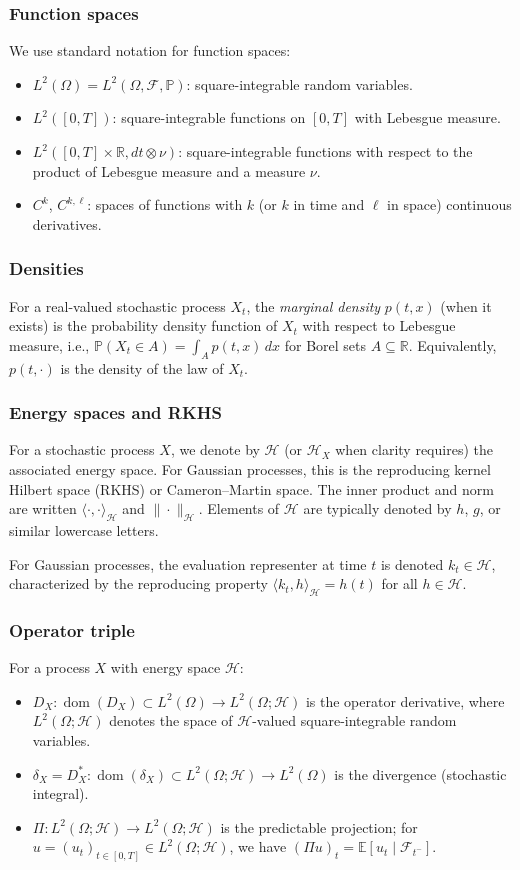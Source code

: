 \documentclass[12pt]{article}
\theoremstyle{plain}
\theoremstyle{definition}
\theoremstyle{remark}
\newcommand{\E}{\mathbb{E}}
\newcommand{\R}{\mathbb{R}}
\newcommand{\F}{\mathcal{F}}
\newcommand{\PP}{\mathbb{P}}
\newcommand{\HH}{\mathcal{H}}
\newcommand{\dom}{\operatorname{dom}}
\begin{document}
\subsubsection*{Function spaces}
We use standard notation for function spaces:
\begin{itemize}
\item $L^2(\Omega) = L^2(\Omega, \F, \PP)$: square-integrable random variables.
\item $L^2([0,T])$: square-integrable functions on $[0,T]$ with Lebesgue measure.
\item $L^2([0,T] \times \R, dt \otimes \nu)$: square-integrable functions with respect to the product of Lebesgue measure and a measure $\nu$.
\item $C^{k}$, $C^{k,\ell}$: spaces of functions with $k$ (or $k$ in time and $\ell$ in space) continuous derivatives.
\end{itemize}

\subsubsection*{Densities}
For a real-valued stochastic process $X_t$, the \emph{marginal density} $p(t,x)$ (when it exists) is the probability density function of $X_t$ with respect to Lebesgue measure, i.e., $\PP(X_t \in A) = \int_A p(t,x)\,dx$ for Borel sets $A \subseteq \R$. Equivalently, $p(t,\cdot)$ is the density of the law of $X_t$.

\subsubsection*{Energy spaces and RKHS}
For a stochastic process $X$, we denote by $\HH$ (or $\HH_X$ when clarity requires) the associated energy space. For Gaussian processes, this is the reproducing kernel Hilbert space (RKHS) or Cameron--Martin space. The inner product and norm are written $\langle \cdot, \cdot \rangle_{\HH}$ and $\|\cdot\|_{\HH}$. Elements of $\HH$ are typically denoted by $h$, $g$, or similar lowercase letters.

For Gaussian processes, the evaluation representer at time $t$ is denoted $k_t \in \HH$, characterized by the reproducing property $\langle k_t, h \rangle_{\HH} = h(t)$ for all $h \in \HH$.

\subsubsection*{Operator triple}
For a process $X$ with energy space $\HH$:
\begin{itemize}
\item $D_X: \dom(D_X) \subset L^2(\Omega) \to L^2(\Omega; \HH)$ is the operator derivative, where $L^2(\Omega; \HH)$ denotes the space of $\HH$-valued square-integrable random variables.
\item $\delta_X = D_X^*: \dom(\delta_X) \subset L^2(\Omega; \HH) \to L^2(\Omega)$ is the divergence (stochastic integral).
\item $\Pi: L^2(\Omega; \HH) \to L^2(\Omega; \HH)$ is the predictable projection; for $u = (u_t)_{t \in [0,T]} \in L^2(\Omega; \HH)$, we have $(\Pi u)_t = \E[u_t \mid \F_{t^-}]$.
\end{itemize}
\end{document}

